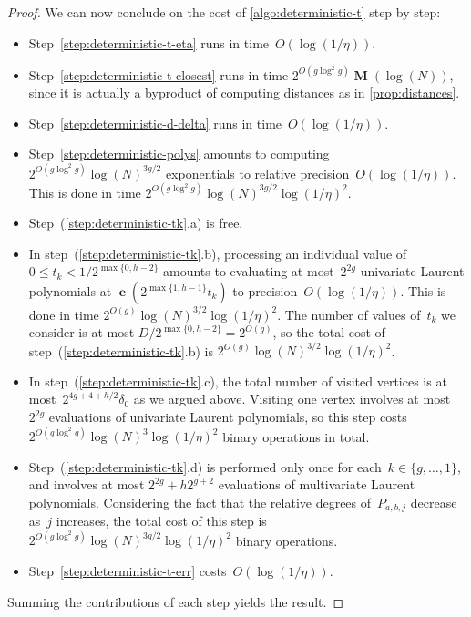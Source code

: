 \documentclass[12pt,oneside]{amsart}
\numberwithin{equation}{section}
\theoremstyle{definition}
\DeclareMathOperator{\e}{\mathbf{e}}
\DeclareMathOperator{\Mul}{\mathbf{M}}
\begin{document}
\begin{proof}
  We can now conclude on the cost of \cref{algo:deterministic-t} step by step:
  \begin{itemize}
  \item Step~\eqref{step:deterministic-t-eta} runs in time~$O(\log(1/\eta))$.
  \item Step~\eqref{step:deterministic-t-closest} runs in time
    $2^{O(g \log^2 g)} \Mul(\log(N))$, since it is actually a byproduct of
    computing distances as in \cref{prop:distances}.
  \item Step~\eqref{step:deterministic-d-delta} runs in time~$O(\log(1/\eta))$.
  \item Step~\eqref{step:deterministic-polys} amounts to
    computing~$2^{O(g\log^2 g)} \log(N)^{3g/2}$ exponentials to relative
    precision~$O(\log(1/\eta))$. This is done in time
    $2^{O(g\log^2 g)} \log(N)^{3g/2}\log(1/\eta)^2$.
  \item Step~(\ref{step:deterministic-tk}.a) is free.
  \item In step~(\ref{step:deterministic-tk}.b), processing an individual value
    of~$0\leq t_k < 1/2^{\max\{0,h-2\}}$ amounts to evaluating at most~$2^{2g}$
    univariate Laurent polynomials at $\e(2^{\max\{1,h-1\}}t_k)$ to
    precision~$O(\log(1/\eta))$. This is done in time
    $2^{O(g)}\log(N)^{3/2}\log(1/\eta)^2$.  The number of values of~$t_k$ we
    consider is at most $D/2^{\max\{0,h-2\}} = 2^{O(g)}$, so the total cost of
    step~(\ref{step:deterministic-tk}.b) is
    $2^{O(g)} \log(N)^{3/2} \log(1/\eta)^2$.
  \item In step~(\ref{step:deterministic-tk}.c), the total number of visited
    vertices is at most~$2^{4g + 4 + h/2}\delta_0$ as we argued above. Visiting
    one vertex involves at most~$2^{2g}$ evaluations of univariate Laurent
    polynomials, so this step
    costs~$2^{O(g\log^2 g)} \log(N)^{3} \log(1/\eta)^2$ binary operations in
    total.
  \item Step~(\ref{step:deterministic-tk}.d) is performed only once for
    each~$k \in \{g, \ldots,1\}$, and involves at most $2^{2g} + h2^{g+2}$
    evaluations of multivariate Laurent polynomials. Considering the fact that
    the relative degrees of~$P_{a,b,j}$ decrease as~$j$ increases, the total
    cost of this step is
    $2^{O(g\log^2 g)} \log(N)^{3g/2} \log(1/\eta)^2$ binary operations.
  \item Step~\eqref{step:deterministic-t-err} costs~$O(\log(1/\eta))$.
  \end{itemize}
  Summing the contributions of each step yields the result.
\end{proof}
\end{document}
